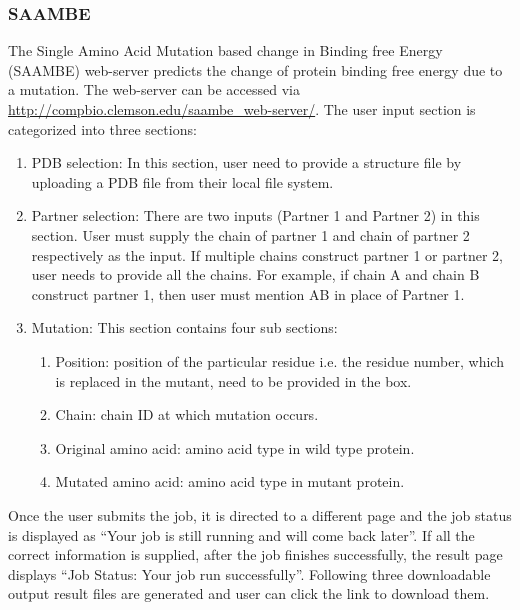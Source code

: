 \documentclass[9pt,tutorial]{livecoms}
\begin{document}
\subsubsection{SAAMBE}
The Single Amino Acid Mutation based change in Binding free Energy (SAAMBE)\cite{petukh2015predicting} web-server predicts the change of protein binding free energy due to a mutation. The web-server\cite{petukh2015predicting,petukh2016saambe} can be accessed via \url{http://compbio.clemson.edu/saambe_web-server/}. 
The user input section is categorized into three sections:
\begin{enumerate}
    \item PDB selection: In this section, user need to provide a structure file by uploading a PDB file from their local file system.
    
    \item Partner selection: There are two inputs (Partner 1 and Partner 2) in this section. User must supply the chain of partner 1 and chain of partner 2 respectively as the input. If multiple chains construct partner 1 or partner 2, user needs to provide all the chains. For example, if chain A and chain B construct partner 1, then user must mention AB in place of Partner 1.
    
    \item Mutation: This section contains four sub sections:
    \begin{enumerate}
	    \item Position: position of the particular residue i.e. the residue number, which is replaced in the mutant, need to be provided in the box.
	    
	    \item Chain: chain ID at which mutation occurs.
	    
	    \item Original amino acid: amino acid type in wild type protein.
	    
	    \item Mutated amino acid: amino acid type in mutant protein.
    \end{enumerate}
\end{enumerate}
Once the user submits the job, it is directed to a different page and the job status is displayed as ``Your job is still running and will come back later''. If all the correct information is supplied, after the job finishes successfully, the result page displays “Job Status: Your job run successfully”. Following three downloadable output result files are generated and user can click the link to download them.
\end{document}
